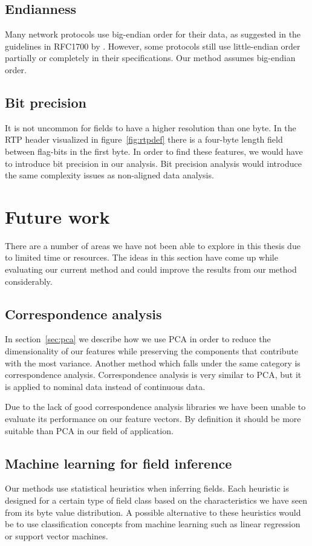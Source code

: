\documentclass[a4paper]{report}
\begin{document}
\subsection{Endianness}
Many network protocols use big-endian order for their data, as suggested
in the guidelines in RFC1700 by \citet{reynolds94}. However, some protocols
still use little-endian order partially or completely in their specifications.
Our method assumes big-endian order.

\subsection{Bit precision}
It is not uncommon for fields to have a higher resolution than one byte. In
the RTP header visualized in figure~\ref{fig:rtpdef} there is a four-byte
length field between flag-bits in the first byte. In order to find these
features, we would have to introduce bit precision in our analysis. Bit
precision analysis would introduce the same complexity issues as non-aligned
data analysis.


\section{Future work}
There are a number of areas we have not been able to explore in this thesis
due to limited time or resources. The ideas in this section have come up
while evaluating our current method and could improve the results from our
method considerably.

\subsection{Correspondence analysis}
In section~\ref{sec:pca} we describe how we use PCA in order to reduce the
dimensionality of our features while preserving the components that contribute
with the most variance. Another method which falls under the same category is
correspondence analysis. Correspondence analysis is very similar to PCA, but
it is applied to nominal data instead of continuous data.

Due to the lack of good correspondence analysis libraries we have been unable
to evaluate its performance on our feature vectors. By definition it should
be more suitable than PCA in our field of application.

\subsection{Machine learning for field inference}
Our methods use statistical heuristics when inferring fields. Each heuristic
is designed for a certain type of field class based on the characteristics we
have seen from its byte value distribution. A possible alternative to these
heuristics would be to use classification concepts from machine learning such
as linear regression or support vector machines.
\end{document}
